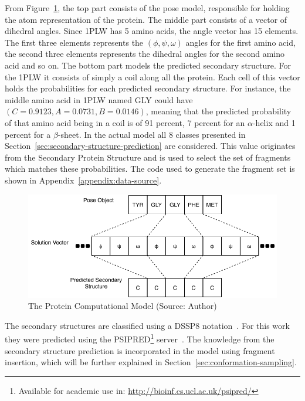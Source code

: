 From Figure~\ref{fig:protein-model}, the top part consists of the pose model,
responsible for holding the atom representation of the protein. The middle part
consists of a vector of dihedral angles. Since 1PLW has 5 amino acids, the
angle vector has 15 elements.  The first three elements represents the $(\phi,
\psi, \omega)$ angles for the first amino acid, the second three elements
represents the dihedral angles for the second amino acid and so on. The bottom
part models the predicted secondary structure. For the 1PLW it consists of
simply a coil along all the protein.  Each cell of this vector holds the
probabilities for each predicted secondary structure.  For instance, the middle
amino acid in 1PLW named GLY could have $(C=0.9123, A=0.0731, B=0.0146)$,
meaning that the predicted probability of that amino acid being in a coil is of 91
percent, 7 percent for an $\alpha$-helix and 1 percent for a $\beta$-sheet. In
the actual model all 8 classes presented in
Section~\ref{sec:secondary-structure-prediction} are considered. This value
originates from the Secondary Protein Structure and is used to select
the set of fragments which matches these probabilities. The code used to generate
the fragment set is shown in Appendix~\ref{appendix:data-source}.

\begin{figure}
    \centering
    \includegraphics{Figuras/protein-representation.pdf}
    \vspace{1mm}
    \caption{The Protein Computational Model (Source: Author)}
    \label{fig:protein-model}
\end{figure}

The secondary structures are classified using a DSSP8
notation~\cite{frishman1995knowledge}.  For this work they were predicted using
the PSIPRED\footnote{Available for academic use in:
\url{http://bioinf.cs.ucl.ac.uk/psipred/}}  server~\cite{mcguffin2000psipred}.
The knowledge from the secondary
structure prediction is incorporated in the model using fragment insertion,
which will be further explained in Section~\ref{sec:conformation-sampling}.

